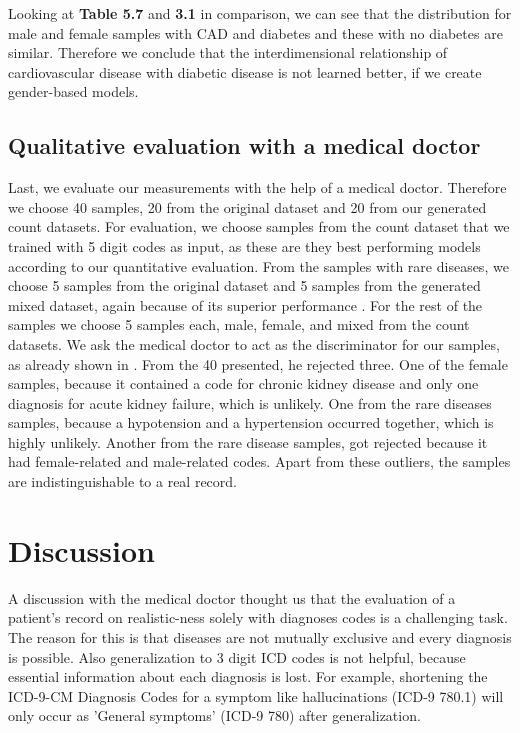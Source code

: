 \documentclass[11pt, a4paper, oneside]{book}
\begin{document}
Looking at \textbf{Table 5.7} and \textbf{3.1} in comparison, we can see that the distribution for male and female samples with CAD and diabetes and these with no diabetes are similar. Therefore we conclude that the interdimensional relationship of cardiovascular disease with diabetic disease is not learned better, if we create gender-based models.

\subsection{Qualitative evaluation with a medical doctor}
Last, we evaluate our measurements with the help of a medical doctor. Therefore we choose 40 samples, 20 from the original dataset and 20 from our generated count datasets. For evaluation, we choose samples from the count dataset that we trained with 5 digit codes as input, as these are they best performing models according to our quantitative evaluation. From the samples with rare diseases, we choose 5 samples from the original dataset and 5 samples from the generated mixed dataset, again because of its superior performance . For the rest of the samples we choose 5 samples each, male, female, and mixed from the count datasets.
We ask the medical doctor to act as the discriminator for our samples, as already shown in \citep{Choi2017}. From the 40 presented, he rejected three.
One of the female samples, because it contained a code for chronic kidney disease and only one diagnosis for acute kidney failure, which is unlikely. One from the rare diseases samples, because a hypotension and a hypertension occurred together, which is highly unlikely. Another from the rare disease samples, got rejected because it had female-related and male-related codes.
Apart from these outliers, the samples are indistinguishable to a real record.


\section{Discussion}
A discussion with the medical doctor thought us that the evaluation of a patient's record on realistic-ness solely with diagnoses codes is a challenging task. The reason for this is that diseases are not mutually exclusive and every diagnosis is possible. Also generalization to 3 digit ICD codes is not helpful, because essential information about each diagnosis is lost. For example, shortening the ICD-9-CM Diagnosis Codes for a symptom like hallucinations (ICD-9 780.1) will only occur as 'General symptoms' (ICD-9 780) after generalization. 
\end{document}
